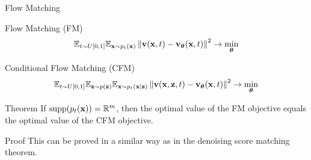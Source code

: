 \documentclass{beamer}
\begin{document}
\begin{frame}{Flow Matching}
	\begin{block}{Flow Matching (FM)}
		\vspace{-0.3cm}
		\[
			\mathbb{E}_{t \sim U[0, 1]} \mathbb{E}_{\mathbf{x} \sim p_t(\mathbf{x})}\left\| \mathbf{v}(\mathbf{x}, t) - \mathbf{v}_{\boldsymbol{\theta}}(\mathbf{x}, t) \right\|^2 \rightarrow \min_{\boldsymbol{\theta}}
		\]
		\vspace{-0.3cm}
	\end{block}
	\begin{block}{Conditional Flow Matching (CFM)}
		\vspace{-0.3cm}
		\[
			\mathbb{E}_{t \sim U[0, 1]} \mathbb{E}_{\mathbf{z} \sim p(\mathbf{z})} \mathbb{E}_{\mathbf{x} \sim p_t(\mathbf{x} | \mathbf{z})}\left\| \mathbf{v}(\mathbf{x}, \mathbf{z}, t) - \mathbf{v}_{\boldsymbol{\theta}}(\mathbf{x}, t) \right\|^2 \rightarrow \min_{\boldsymbol{\theta}}
		\]
		\vspace{-0.5cm}
	\end{block}
    \eqpause
	\begin{block}{Theorem}
		If $\operatorname{supp}(p_t(\mathbf{x})) = \mathbb{R}^m$, then the optimal value of the FM objective equals the optimal value of the CFM objective.
	\end{block}
    \eqpause
	\begin{block}{Proof}
		This can be proved in a similar way as in the denoising score matching theorem.
	\end{block}
\end{frame}
\end{document}
